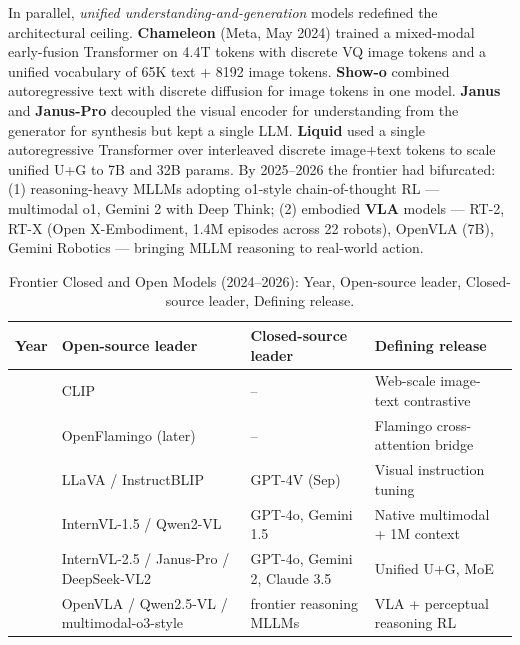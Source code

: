 \documentclass{article}
\begin{document}
In parallel, \emph{unified understanding-and-generation} models redefined the architectural ceiling. \textbf{Chameleon} (Meta, May 2024) trained a mixed-modal early-fusion Transformer on 4.4T tokens with discrete VQ image tokens and a unified vocabulary of 65K text + 8192 image tokens. \textbf{Show-o} \citep{xie20242024} combined autoregressive text with discrete diffusion for image tokens in one model. \textbf{Janus} and \textbf{Janus-Pro} \citep{wu20242024} decoupled the visual encoder for understanding from the generator for synthesis but kept a single LLM. \textbf{Liquid} \citep{wu20242024} used a single autoregressive Transformer over interleaved discrete image+text tokens to scale unified U+G to 7B and 32B params. By 2025--2026 the frontier had bifurcated: (1) reasoning-heavy MLLMs adopting o1-style chain-of-thought RL --- multimodal o1, Gemini 2 with Deep Think; (2) embodied \textbf{VLA} models --- RT-2, RT-X (Open X-Embodiment, 1.4M episodes across 22 robots), OpenVLA (7B), Gemini Robotics --- bringing MLLM reasoning to real-world action.

\begin{table}[t]
\centering
\caption{Frontier Closed and Open Models (2024--2026): Year, Open-source leader, Closed-source leader, Defining release.}
\label{tab:frontier-closed-and-open-models-2024-2026}
\begin{tabular}{>{\raggedright\arraybackslash}p{0.0727\linewidth}
  >{\raggedright\arraybackslash}p{0.3818\linewidth}
  >{\raggedright\arraybackslash}p{0.2545\linewidth}
  >{\raggedright\arraybackslash}p{0.2909\linewidth}}
\toprule
\textbf{Year} & \textbf{Open-source leader} & \textbf{Closed-source leader} & \textbf{Defining release} \\
\midrule
2021 & CLIP & -- & Web-scale image-text contrastive \\
2022 & OpenFlamingo (later) & -- & Flamingo cross-attention bridge \\
2023 & LLaVA / InstructBLIP & GPT-4V (Sep) & Visual instruction tuning \\
2024 & InternVL-1.5 / Qwen2-VL & GPT-4o, Gemini 1.5 & Native multimodal + 1M context \\
2025 & InternVL-2.5 / Janus-Pro / DeepSeek-VL2 & GPT-4o, Gemini 2, Claude 3.5 & Unified U+G, MoE \\
2026 & OpenVLA / Qwen2.5-VL / multimodal-o3-style & frontier reasoning MLLMs & VLA + perceptual reasoning RL \\
\end{tabular}
\end{table}
\end{document}
